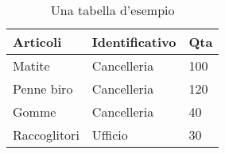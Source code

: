 \begin{table}[h!]
  \centering
  \begin{tabular}{|l|l|l|}
    \hline
    Articoli      & Identificativo & Qta \\ \hline
    Matite        & Cancelleria    & 100 \\ \hline
    Penne biro    & Cancelleria    & 120 \\ \hline
    Gomme         & Cancelleria    & 40  \\ \hline
    Raccoglitori  & Ufficio        & 30  \\ \hline
  \end{tabular}
  \caption{Una tabella d'esempio}
\end{table}
